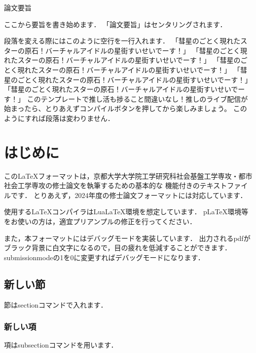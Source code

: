 \documentclass[a4paper, 11pt]{report}
\begin{document}
\begin{center}
    {\fontsize{12pt}{26pt}\selectfont \gtfamily 論文要旨} %
\end{center}
\par \indent
ここから要旨を書き始めます．
「論文要旨」はセンタリングされます．

段落を変える際にはこのように空行を一行入れます．
「彗星のごとく現れたスターの原石！バーチャルアイドルの星街すいせいでーす！」
「彗星のごとく現れたスターの原石！バーチャルアイドルの星街すいせいでーす！」
「彗星のごとく現れたスターの原石！バーチャルアイドルの星街すいせいでーす！」
「彗星のごとく現れたスターの原石！バーチャルアイドルの星街すいせいでーす！」
「彗星のごとく現れたスターの原石！バーチャルアイドルの星街すいせいでーす！」
このテンプレートで推し活も捗ること間違いなし！推しのライブ配信が始まったら、とりあえずコンパイルボタンを押してから楽しみましょう。
このようにすれば段落は変わりません．
\newpage

\tableofcontents
\newpage

\clearpage
{}

\chapter{はじめに}
この\LaTeX フォーマットは，京都大学大学院工学研究科社会基盤工学専攻・都市社会工学専攻の修士論文を執筆するための基本的な
機能付きのテキストファイルです．
とりあえず，2024年度の修士論文フォーマットには対応しています．

使用する\LaTeX コンパイラはLuaLaTeX環境を想定しています．
pLaTeX環境等をお使いの方は，適宜プリアンプルの修正を行ってください．

また，本フォーマットにはデバッグモードを実装しています．
出力されるpdfがブラック背景に白文字になるので，目の疲れを低減することができます．
submissionmodeの1を0に変更すればデバッグモードになります．

\section{新しい節}
節はsectionコマンドで入れます．

\subsection{新しい項}
項はsubsectionコマンドを用います．
\end{document}

